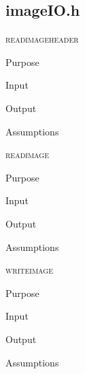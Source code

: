 \documentclass[pdftex, 11pt]{article}
\begin{document}
\subsection{imageIO.h}

\begin{description}
	\item{\textsc{readimageheader}}
		\begin{description}
			\item{Purpose}


			\item{Input}


			\item{Output}


			\item{Assumptions}


		\end{description}


	\item{\textsc{readimage}}
		\begin{description}
			\item{Purpose}


			\item{Input}


			\item{Output}


			\item{Assumptions}


		\end{description}


	\item{\textsc{writeimage}}
		\begin{description}
			\item{Purpose}


			\item{Input}


			\item{Output}


			\item{Assumptions}


		\end{description}


\end{description}
\end{document}

